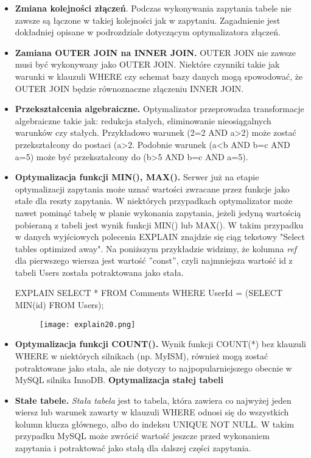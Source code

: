 \begin{itemize}
	\item \textbf{Zmiana kolejności złączeń}. Podczas wykonywania zapytania tabele nie zawsze są łączone w takiej kolejności jak w zapytaniu. Zagadnienie jest dokładniej opisane w podrozdziale dotyczącym optymalizatora złączeń.
	\item \textbf{Zamiana OUTER JOIN na INNER JOIN.} OUTER JOIN nie zawsze musi być wykonywany jako OUTER JOIN. Niektóre czynniki takie jak warunki w klauzuli WHERE czy schemat bazy danych mogą spowodować, że OUTER JOIN będzie równoznaczne złączeniu INNER JOIN. 
	\item \textbf{Przekształcenia algebraiczne.} Optymalizator przeprowadza transformacje algebraiczne takie jak: redukcja stałych, eliminowanie nieosiągalnych warunków czy stałych. Przykładowo warunek (2=2 AND a>2) może zostać przekształcony do postaci (a>2. Podobnie warunek (a<b AND b=c AND a=5) może być przekształcony do (b>5 AND b=c AND a=5).
	\item \textbf{Optymalizacja funkcji MIN(), MAX().}
	Serwer już na etapie optymalizacji zapytania może uznać wartości zwracane przez funkcje jako stałe dla reszty zapytania. W niektórych przypadkach optymalizator może nawet pominąć tabelę w planie wykonania zapytania, jeżeli jedyną wartością pobieraną z tabeli jest wynik funkcji MIN() lub MAX(). W takim przypadku w danych wyjściowych polecenia EXPLAIN znajdzie się ciąg tekstowy "Select tables optimized away".
	Na poniższym przykładzie widzimy, że kolumna \textit{ref} dla pierwszego wiersza jest wartość ''const'', czyli najmniejsza wartość id z tabeli Users została potraktowana jako stała.
	\begin{spverbatim}
		EXPLAIN SELECT * FROM Comments WHERE UserId = (SELECT MIN(id) FROM Users);
	\end{spverbatim}
	\begin{figure}[H]
		\texttt{[image: explain20.png]} 
	\end{figure}
	\item \textbf{Optymalizacja funkcji COUNT().} Wynik funkcji COUNT(*) bez klauzuli WHERE w niektórych silnikach (np. MyISM), również mogą zostać potraktowane jako stała, ale nie dotyczy to najpopularniejszego obecnie w MySQL silnika InnoDB.
	\textbf{Optymalizacja stałej tabeli}
	
	\item \textbf{Stałe tabele.} \textit{Stała tabela} jest to tabela, która zawiera co najwyżej jeden wiersz lub warunek zawarty w klauzuli WHERE odnosi się do wszystkich kolumn klucza głównego, albo do indeksu UNIQUE NOT NULL. W takim przypadku MySQL może zwrócić wartość jeszcze przed wykonaniem zapytania i potraktować jako stałą dla dalszej części zapytania.
\end{itemize}

